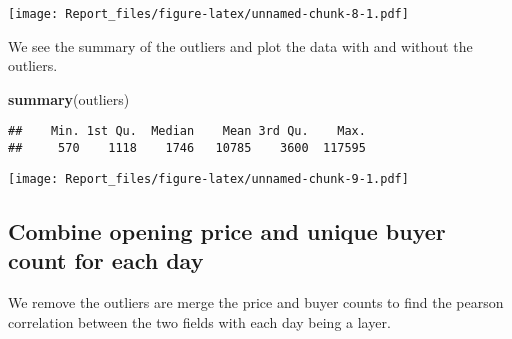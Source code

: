 \documentclass[]{article}
\newenvironment{Shaded}{\begin{snugshade}}{\end{snugshade}}
\newcommand{\KeywordTok}[1]{\textcolor[rgb]{0.13,0.29,0.53}{\textbf{#1}}}
\newcommand{\DataTypeTok}[1]{\textcolor[rgb]{0.13,0.29,0.53}{#1}}
\newcommand{\DecValTok}[1]{\textcolor[rgb]{0.00,0.00,0.81}{#1}}
\newcommand{\StringTok}[1]{\textcolor[rgb]{0.31,0.60,0.02}{#1}}
\newcommand{\OperatorTok}[1]{\textcolor[rgb]{0.81,0.36,0.00}{\textbf{#1}}}
\newcommand{\NormalTok}[1]{#1}
\begin{document}
\begin{Shaded}
\end{Shaded}

\texttt{[image: Report\_files/figure-latex/unnamed-chunk-8-1.pdf]}

We see the summary of the outliers and plot the data with and without
the outliers.

\begin{Shaded}
\begin{Highlighting}[]
\KeywordTok{summary}\NormalTok{(outliers)}
\end{Highlighting}
\end{Shaded}

\begin{verbatim}
##    Min. 1st Qu.  Median    Mean 3rd Qu.    Max. 
##     570    1118    1746   10785    3600  117595
\end{verbatim}

\begin{Shaded}
\end{Shaded}

\texttt{[image: Report\_files/figure-latex/unnamed-chunk-9-1.pdf]}

\subsection{Combine opening price and unique buyer count for each
day}\label{combine-opening-price-and-unique-buyer-count-for-each-day}

We remove the outliers are merge the price and buyer counts to find the
pearson correlation between the two fields with each day being a layer.
\end{document}
